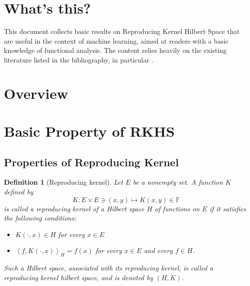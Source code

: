 \documentclass[a4paper,12pt]{article}
\newtheorem{dfn}[thm]{Definition}
\theoremstyle{remark}
\theoremstyle{definition}
\theoremstyle{definition}
\theoremstyle{definition}
\newcommand{\ip}[2]{\left<#1, #2 \right>}
\begin{document}
\section*{What's this?}
This document collects basic results on Reproducing Kernel Hilbert Space that are useful in the context of machine learning, aimed at readers with a basic knowledge of functional analysis. The content relies heavily on the existing literature listed in the bibliography, in particular \cite{Berlinet:RKHS} \cite{Christmann-Steinwart:SVM}.
\cite{Cucker-Zhou:Learning-Theory}
\cite{Paulsen-Raghupathi:Intro-RKHS}
\cite{Schlkopf-Smola:Learning-with-kernels}
\section*{Overview}

\tableofcontents
\section{Basic Property of RKHS}
\subsection{Properties of Reproducing Kernel}
\begin{dfn}[Reproducing kernel]
	Let \( E \) be a nonempty set. A function \( K \) defined by
	\[
		K:E \times E \ni (x,y) \mapsto K(x,y) \in \mathbb{F}
	\]
	is called a reproducing kernel of a Hilbert space \( H \) of functions on \( E \) if it satisfies the following conditions:
	\begin{itemize}
		\item[(a)] \( K(\cdot, x) \in H \) for every \( x \in E \)
		\item[(b)]  \( \ip{f}{K(\cdot, x)}_H = f(x) \) for every \( x \in E \) and every \( f \in H \).
	\end{itemize}
	Such a Hilbert space, associated with its reproducing kernel, is called a reproducing kernel hilbert space, and is denoted by \( (H,K) \).
\end{dfn}
\end{document}
